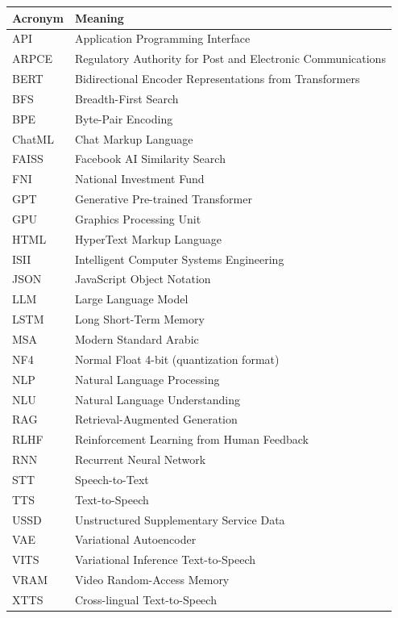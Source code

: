 \documentclass[12pt, a4paper]{report}
\begin{document}
\begin{tabularx}{\textwidth}{l X}
\toprule
\textbf{Acronym} & \textbf{Meaning} \\
\midrule
API    & Application Programming Interface \\
ARPCE  & Regulatory Authority for Post and Electronic Communications \\
BERT   & Bidirectional Encoder Representations from Transformers \\
BFS    & Breadth-First Search \\
BPE    & Byte-Pair Encoding \\
ChatML & Chat Markup Language \\
FAISS  & Facebook AI Similarity Search \\
FNI    & National Investment Fund \\
GPT    & Generative Pre-trained Transformer \\
GPU    & Graphics Processing Unit \\
HTML   & HyperText Markup Language \\
ISII   & Intelligent Computer Systems Engineering \\
JSON   & JavaScript Object Notation \\
LLM    & Large Language Model \\
LSTM   & Long Short-Term Memory \\
MSA    & Modern Standard Arabic \\
NF4    & Normal Float 4-bit (quantization format) \\
NLP    & Natural Language Processing \\
NLU    & Natural Language Understanding \\
RAG    & Retrieval-Augmented Generation \\
RLHF   & Reinforcement Learning from Human Feedback \\
RNN    & Recurrent Neural Network \\
STT    & Speech-to-Text \\
TTS    & Text-to-Speech \\
USSD   & Unstructured Supplementary Service Data \\
VAE    & Variational Autoencoder \\
VITS   & Variational Inference Text-to-Speech \\
VRAM   & Video Random-Access Memory \\
XTTS   & Cross-lingual Text-to-Speech \\
\bottomrule
\end{tabularx}
\end{document}
